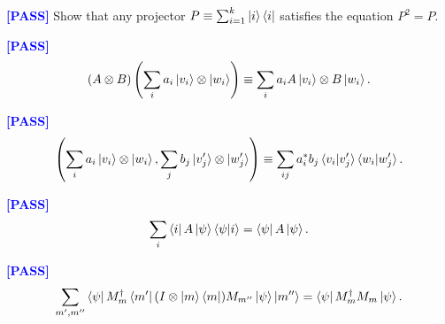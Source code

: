 \documentclass[manuscript, review, timestamp]{acmart}
\newcommand{\pass}{\textcolor{blue}{\textbf{ [PASS] }}}
\newcommand{\fail}{\textcolor{red}{\textbf{ [FAIL] }}}
\begin{document}
\begin{example} \pass
  Show that any projector $P\equiv \sum_{i=1}^k \ket{i}\bra{i}$ satisfies the equation $P^2=P$.
\end{example}

\begin{example}[QCQI (2.46)] \pass
  $$
    (A \otimes B)\left(\sum_i a_i \ket{v_i}\otimes\ket{w_i}\right) \equiv \sum_i a_i A \ket{v_i} \otimes B\ket{w_i}.
  $$
\end{example}

\begin{example}[QCQI (2.49)] \pass
  $$
    \left(\sum_i a_i \ket{v_i}\otimes\ket{w_i}, \sum_j b_j \ket{v'_j}\otimes \ket{w'_j}\right) \equiv \sum_{ij}a_i^*b_j\braket{v_i|v'_j}\braket{w_i|w'_j}.
  $$
\end{example}

\begin{example}[QCQI (2.61)] \pass
  $$
    \sum_i\bra{i}A\ket{\psi}\braket{\psi|i} = \bra{\psi}A\ket{\psi}.
  $$
\end{example}


\begin{example}[QCQI (2.128)] \pass
  $$
    \sum_{m',m''}\bra{\psi}M_m^\dagger\bra{m'}(I\otimes\ket{m}\bra{m})M_{m''}\ket{\psi}\ket{m''} = \bra{\psi}M_m^\dagger M_m\ket{\psi}.
  $$
\end{example}
\end{document}
